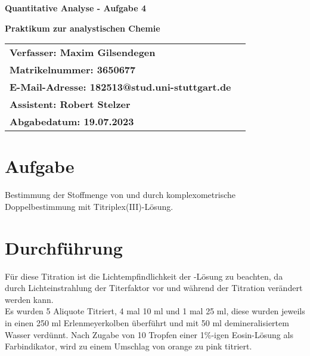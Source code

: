 \documentclass[12pt]{scrartcl} %
\begin{document}
\begin{titlepage}
\begin{center}
\vspace*{2cm}
\begin{LARGE}
\vspace*{1cm}
\textbf{\textsf{Quantitative Analyse - Aufgabe 4\\}}
\end{LARGE}
\vspace*{1cm}
\textbf{\textsf{Praktikum zur analystischen Chemie}}\\
\vspace*{1.5cm}
\begin{table}[H]
\sffamily
\hspace*{3cm}\begin{tabular}{>{\bfseries}l>{\bfseries}l}
Verfasser: Maxim Gilsendegen\\
Matrikelnummer: 3650677\\
E-Mail-Adresse: 182513@stud.uni-stuttgart.de\\
Assistent: Robert Stelzer\\
Abgabedatum: 19.07.2023\\
\end{tabular}
\end{table}
\end{center}
\end{titlepage}
\renewcommand{\thepage}{\Roman{page}}\setcounter{page}{1}
\tableofcontents %
\newpage
\renewcommand{\thepage}{\arabic{page}}\setcounter{page}{1}

\section{Aufgabe}
Bestimmung der Stoffmenge von  und  durch komplexometrische Doppelbestimmung mit Titriplex(III)-Lösung.\\


\section{Durchführung}
Für diese Titration ist die Lichtempfindlichkeit der -Lösung zu beachten, da durch Lichteinstrahlung der Titerfaktor vor und während der Titration verändert werden kann.\\
Es wurden 5 Aliquote Titriert, 4 mal 10 ml und 1 mal 25 ml, diese wurden jeweils in einen 250 ml Erlenmeyerkolben überführt und mit 50 ml demineralisiertem Wasser verdünnt. Nach Zugabe von 10 Tropfen einer 1\%-igen Eosin-Lösung als Farbindikator, wird zu einem Umschlag von orange zu pink titriert.
\end{document}
